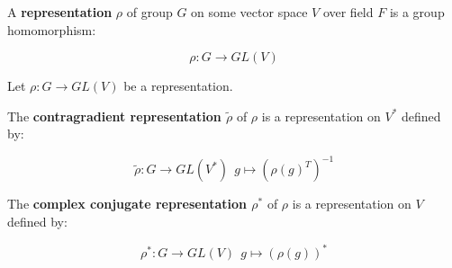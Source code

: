 \begin{defn}

    A \textbf{representation} $\rho$ of group $G$ on some vector space $V$ over field $F$ is a group homomorphism:

    $$ \rho: G \to GL(V)$$

\end{defn}

Let $ \rho: G \to GL(V)$ be a representation.

\begin{defn}

    The \textbf{contragradient representation $\tilde \rho$} of $\rho$ is a representation on $V^*$ defined by:

    $$ \tilde \rho: G \to GL(V^*) ~~ g \mapsto ( \rho(g)^T )^{-1} $$

\end{defn}


\begin{defn}

    The \textbf{complex conjugate representation $\rho^*$} of $\rho$ is a representation on $V$ defined by:

    $$ \rho^*: G \to GL(V) ~~ g \mapsto (\rho(g))^* $$

\end{defn}
